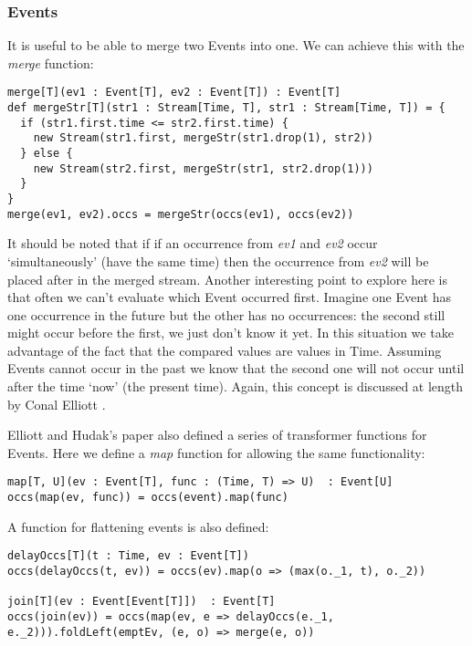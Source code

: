       \subsubsection{Events}
        It is useful to be able to merge two Events into one. We can achieve this with the \emph{merge} function:

\begin{verbatim}
merge[T](ev1 : Event[T], ev2 : Event[T]) : Event[T]
def mergeStr[T](str1 : Stream[Time, T], str1 : Stream[Time, T]) = {
  if (str1.first.time <= str2.first.time) {
    new Stream(str1.first, mergeStr(str1.drop(1), str2))
  } else {
    new Stream(str2.first, mergeStr(str1, str2.drop(1)))
  }
}
merge(ev1, ev2).occs = mergeStr(occs(ev1), occs(ev2))
\end{verbatim}            

      It should be noted that if if an occurrence from \emph{ev1} and \emph{ev2} occur `simultaneously' (have the same time) then
      the occurrence from \emph{ev2} will be placed after in the merged stream. Another interesting point to explore
      here is that often we can't evaluate which Event occurred first. Imagine one Event has one occurrence in
      the future but the other has no occurrences: the second still might occur before the first, we just don't know it
      yet. In this situation we take advantage of the fact that the compared values are values in Time. Assuming
      Events cannot occur in the past we know that the second one will not occur until after the time `now' (the
      present time). Again, this concept is discussed at length by Conal Elliott \cite{Elliott2009}.
       
      Elliott and Hudak's paper also defined a series of transformer functions for Events. Here we define a
     \emph{map} function for allowing the same functionality:

\begin{verbatim}
map[T, U](ev : Event[T], func : (Time, T) => U)  : Event[U]
occs(map(ev, func)) = occs(event).map(func)
\end{verbatim}     

      A function for flattening events is also defined:

\begin{verbatim}
delayOccs[T](t : Time, ev : Event[T])
occs(delayOccs(t, ev)) = occs(ev).map(o => (max(o._1, t), o._2))

join[T](ev : Event[Event[T]])  : Event[T]
occs(join(ev)) = occs(map(ev, e => delayOccs(e._1, e._2))).foldLeft(emptEv, (e, o) => merge(e, o))
\end{verbatim}        

